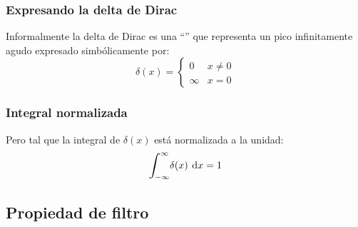 \documentclass[12pt]{beamer}
\begin{document}
\begin{frame}
\frametitle{Expresando la delta de Dirac}
Informalmente la delta de Dirac es una \enquote{} que representa un pico infinitamente agudo expresado simbólicamente por:
\pause
\begin{equation}
\delta (x) = \begin{cases}
0 & x \neq 0 \\
\infty & x = 0
\end{cases}
\label{eq:ecuacion_delta_01}
\end{equation}
\end{frame}
\begin{frame}
\frametitle{Integral normalizada}
Pero tal que la integral de $\delta (x)$ está normalizada a la unidad:
\pause
\begin{equation}
\scaleint{6ex}_{\bs -\infty}^{\infty} \delta (x) \: \dd{x} = 1 
\label{eq:ecuacion_delta_02}
\end{equation}
\end{frame}

\subsection{Propiedad de filtro}
\end{document}
